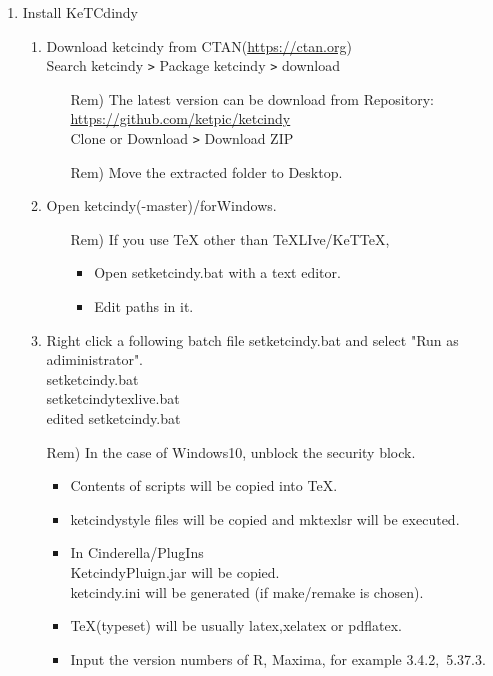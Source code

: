 \documentclass{article}
\begin{document}
\begin{enumerate}[\bf\large 1.]
\item Install KeTCdindy
  \begin{enumerate}[(1)]
  \item Download ketcindy from CTAN(\url{https://ctan.org})\\
  \hspace*{10mm}Search ketcindy \verb|>| Pack­age ketcindy \verb|>| download
    \begin{itemize}
    \item[Rem)]The latest version can be download from Repository:\\
        \hspace*{5mm}\url{https://github.com/ket­pic/ketcindy}\\
        \hspace*{10mm}Clone or Download \verb|>| Download ZIP
    \item[Rem)]Move the extracted folder to Desktop.
    \end{itemize}
  \item Open ketcindy(-master)/forWindows.
    \begin{itemize}
   \item[Rem)]If you use TeX other than TeXLIve/KeTTeX,
      \begin{itemize}
      \item Open setketcindy.bat with a text editor.
      \item Edit paths in it.
      \end{itemize}
    \end{itemize}
  \item Right click a following batch file setketcindy.bat and select "Run as adiministrator".\\
  \hspace*{10mm} setketcindy.bat\\
  \hspace*{10mm} setketcindytexlive.bat\\
  \hspace*{10mm} edited setketcindy.bat
   \item[Rem)]In the case of Windows10, unblock the security block.    \begin{itemize}
    \item Contents of scripts will be copied into TeX.
    \item ketcindystyle files will be copied and mktexlsr will be executed.
    \item In Cinderella/PlugIns\\
    \hspace*{5mm}KetcindyPluign.jar will be copied.\\
    \hspace*{5mm}ketcindy.ini will be generated (if make/remake is chosen).   
    \item TeX(typeset) will be usually latex,xelatex or pdflatex.
    \item Input the version numbers of R, Maxima, for example 3.4.2,\ 5.37.3.


\end{itemize}
\end{enumerate}
\end{enumerate}
\end{document}

